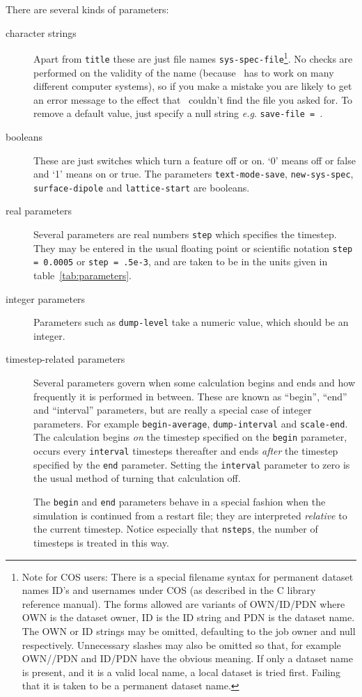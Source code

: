 There are several kinds of parameters:
\begin{description}

\item[character strings] Apart from \verb'title' these are just file
names \eg \verb'sys-spec-file'\footnote{Note for COS users: There is a
special filename syntax for permanent dataset names ID's and usernames
under COS (as described in the C library reference manual). The forms
allowed are variants of OWN/ID/PDN where OWN is the dataset owner, ID
is the ID string and PDN is the dataset name.  The OWN or ID strings
may be omitted, defaulting to the job owner and null respectively.
Unnecessary slashes may also be omitted so that, for example OWN//PDN
and ID/PDN have the obvious meaning. If only a dataset name is
present, and it is a valid local name, a local dataset is tried first.
Failing that it is taken to be a permanent dataset name.}.  No checks
are performed on the validity of the name (because \moldy\  has to work
on many different computer systems), so if you make a mistake you are
likely to get an error message to the effect that \moldy\  couldn't find
the file you asked for.  To remove a default value, just specify a
null string {\em e.g}. \verb'save-file = '.

\item[booleans] These are just switches which turn a feature off or
on. `0' means off or false and `1' means on or true. The parameters
\verb'text-mode-save', \verb'new-sys-spec', 
\verb'surface-dipole' and \verb'lattice-start' are booleans.

\item[real parameters] Several parameters are real numbers \eg
\verb'step' which specifies the timestep.  They may be entered in the
usual floating point or scientific notation \eg \mbox{\verb'step = 0.0005'}
or \mbox{\verb'step = .5e-3'}, and are taken to be in the units given in
table~\ref{tab:parameters}.

\item[integer parameters] Parameters such as \verb'dump-level' take a
numeric value, which should be an integer.

\item[timestep-related parameters] Several parameters govern when some
calculation begins and ends and how frequently it is performed in
between. These are known as ``begin'', ``end'' and ``interval''
parameters, but are really a special case of integer parameters.  For
example \verb'begin-average', \verb'dump-interval' and
\verb'scale-end'.  The calculation begins {\em on\/} the timestep
specified on the \verb'begin' parameter, occurs every \verb'interval'
timesteps thereafter and ends {\em after\/} the timestep specified by
the \verb'end' parameter.  Setting the \verb'interval' parameter to
zero is the usual method of turning that calculation off.

The \verb'begin' and \verb'end' parameters behave in a special fashion
when the simulation is continued from a restart file; they are
interpreted {\em relative\/} to the current timestep.  Notice especially
that \verb'nsteps', the number of timesteps is treated in this way.

\end{description}

